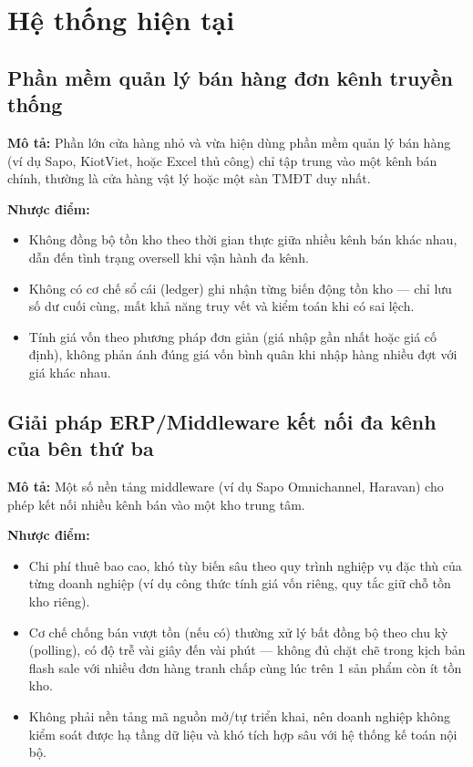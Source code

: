 \section{Hệ thống hiện tại}

\subsection{Phần mềm quản lý bán hàng đơn kênh truyền thống}
\textbf{Mô tả:} Phần lớn cửa hàng nhỏ và vừa hiện dùng phần mềm quản lý bán hàng (ví dụ Sapo, KiotViet, hoặc Excel thủ công) chỉ tập trung vào một kênh bán chính, thường là cửa hàng vật lý hoặc một sàn TMĐT duy nhất.

\textbf{Nhược điểm:}
\begin{itemize}
    \item Không đồng bộ tồn kho theo thời gian thực giữa nhiều kênh bán khác nhau, dẫn đến tình trạng oversell khi vận hành đa kênh.
    \item Không có cơ chế sổ cái (ledger) ghi nhận từng biến động tồn kho — chỉ lưu số dư cuối cùng, mất khả năng truy vết và kiểm toán khi có sai lệch.
    \item Tính giá vốn theo phương pháp đơn giản (giá nhập gần nhất hoặc giá cố định), không phản ánh đúng giá vốn bình quân khi nhập hàng nhiều đợt với giá khác nhau.
\end{itemize}

\subsection{Giải pháp ERP/Middleware kết nối đa kênh của bên thứ ba}
\textbf{Mô tả:} Một số nền tảng middleware (ví dụ Sapo Omnichannel, Haravan) cho phép kết nối nhiều kênh bán vào một kho trung tâm.

\textbf{Nhược điểm:}
\begin{itemize}
    \item Chi phí thuê bao cao, khó tùy biến sâu theo quy trình nghiệp vụ đặc thù của từng doanh nghiệp (ví dụ công thức tính giá vốn riêng, quy tắc giữ chỗ tồn kho riêng).
    \item Cơ chế chống bán vượt tồn (nếu có) thường xử lý bất đồng bộ theo chu kỳ (polling), có độ trễ vài giây đến vài phút — không đủ chặt chẽ trong kịch bản flash sale với nhiều đơn hàng tranh chấp cùng lúc trên 1 sản phẩm còn ít tồn kho.
    \item Không phải nền tảng mã nguồn mở/tự triển khai, nên doanh nghiệp không kiểm soát được hạ tầng dữ liệu và khó tích hợp sâu với hệ thống kế toán nội bộ.
\end{itemize}
